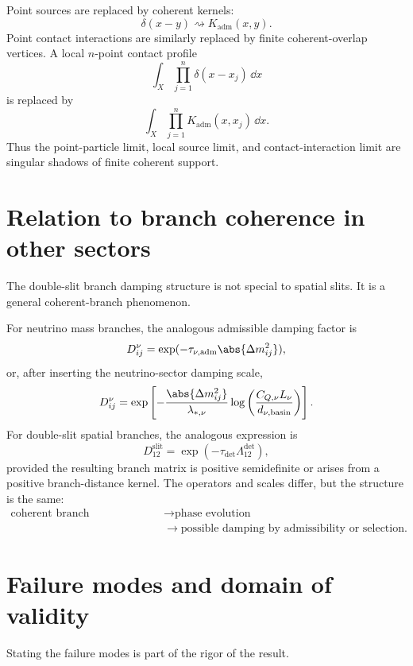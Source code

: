 \documentclass[11pt]{article}
\newcommand{\Kadm}{K_{\mathrm{adm}}}
\begin{document}
Point sources are replaced by coherent kernels:
\[
  \delta(x-y)\rightsquigarrow \Kadm(x,y).
\]
Point contact interactions are similarly replaced by finite coherent-overlap vertices.
A local \(n\)-point contact profile
\[
  \int_X \prod_{j=1}^n \delta(x-x_j)\,\dd x
\]
is replaced by
\[
  \int_X \prod_{j=1}^n \Kadm(x,x_j)\,\dd x.
\]
Thus the point-particle limit, local source limit, and contact-interaction limit are singular
shadows of finite coherent support.

\section{Relation to branch coherence in other sectors}

The double-slit branch damping structure is not special to spatial slits. It is a general
coherent-branch phenomenon.

For neutrino mass branches, the analogous admissible damping factor is
\[
  D_{ij}^{\nu}
  =
  \exp(-\tau_{\nu,\mathrm{adm}}\abs{\Delta m_{ij}^2}),
\]
or, after inserting the neutrino-sector damping scale,
\[
  D_{ij}^{\nu}
  =
  \exp\left[
  -
  \frac{\abs{\Delta m_{ij}^2}}{\lambda_{\ast,\nu}}
  \log\left(\frac{C_{Q,\nu}L_\nu}{d_{\nu,\mathrm{basin}}}\right)
  \right].
\]
For double-slit spatial branches, the analogous expression is
\[
  D_{12}^{\mathrm{slit}}
  =
  \exp(-\tau_{\mathrm{det}}\Lambda_{12}^{\mathrm{det}}),
\]
provided the resulting branch matrix is positive semidefinite or arises from a positive
branch-distance kernel. The operators and scales differ, but the structure is the same:
\[
\begin{aligned}
  \text{coherent branch superposition}
  &\longrightarrow
  \text{phase evolution} \\
  &\longrightarrow
  \text{possible damping by admissibility or selection}.
\end{aligned}
\]

\section{Failure modes and domain of validity}

Stating the failure modes is part of the rigor of the result.
\end{document}
